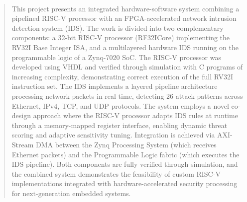 \begin{abstract}
\paragraph{}
This project presents an integrated hardware-software system combining a pipelined RISC-V processor with an FPGA-accelerated network intrusion detection system (IDS). The work is divided into two complementary components: a 32-bit RISC-V processor (RF32ICore) implementing the RV32I Base Integer ISA, and a multilayered hardware IDS running on the programmable logic of a Zynq-7020 SoC. The RISC-V processor was developed using VHDL and verified through simulation with C programs of increasing complexity, demonstrating correct execution of the full RV32I instruction set. The IDS implements a layered pipeline architecture processing network packets in real time, detecting 26 attack patterns across Ethernet, IPv4, TCP, and UDP protocols. The system employs a novel co-design approach where the RISC-V processor adapts IDS rules at runtime through a memory-mapped register interface, enabling dynamic threat scoring and adaptive sensitivity tuning. Integration is achieved via AXI-Stream DMA between the Zynq Processing System (which receives Ethernet packets) and the Programmable Logic fabric (which executes the IDS pipeline). Both components are fully verified through simulation, and the combined system demonstrates the feasibility of custom RISC-V implementations integrated with hardware-accelerated security processing for next-generation embedded systems.

\end{abstract} 



